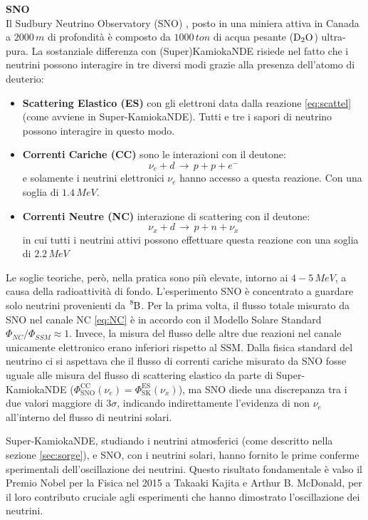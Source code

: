 \textbf{SNO}\\
Il Sudbury Neutrino Observatory (SNO) \cite{SNO:2002ziz}, posto in una miniera attiva in Canada a $2000\,\unit{m}$ di profondità è composto da $1000\,\unit{ton}$ di acqua pesante ($\ce{D_2O}$) ultra-pura. La sostanziale differenza con (Super)KamiokaNDE risiede nel fatto che i neutrini possono interagire in tre diversi modi grazie alla presenza dell'atomo di deuterio:
\vspace{0.4cm}
\begin{itemize}
    \item \textbf{Scattering Elastico (ES)} con gli elettroni data dalla reazione \ref{eq:scattel} (come avviene in Super-KamiokaNDE). Tutti e tre i sapori di neutrino possono interagire in questo modo.
    \item \textbf{Correnti Cariche (CC)} sono le interazioni con il deutone:
    \begin{equation}
        \nu_e+d\,\rightarrow\,p+p+e^-
    \end{equation}
    e solamente i neutrini elettronici $\nu_e$ hanno accesso a questa reazione. Con una soglia di $1.4\,\unit{MeV}$.
    \item \textbf{Correnti Neutre (NC)} interazione di scattering con il deutone: 
    \begin{equation}
        \nu_x+d\,\rightarrow\,p+n+\nu_x
        \label{eq:NC}
    \end{equation}
    in cui tutti i neutrini attivi possono effettuare questa reazione con una soglia di $2.2\,\unit{MeV}$
\end{itemize}
Le soglie teoriche, però, nella pratica sono più elevate, intorno ai $4-5\,\unit{MeV}$, a causa della radioattività di fondo. L'esperimento SNO è concentrato a guardare solo neutrini provenienti da $\ce{^8B}$. Per la prima volta, il flusso totale misurato da SNO nel canale NC \ref{eq:NC} è in accordo con il Modello Solare Standard $\Phi_{NC}/\Phi_{SSM}\approx1$. Invece, la misura del flusso delle altre due reazioni nel canale unicamente elettronico erano inferiori rispetto al SSM. 
Dalla fisica standard del neutrino ci si aspettava che il flusso di correnti cariche misurato da SNO fosse uguale alle misura del flusso di scattering elastico da parte di Super-KamiokaNDE ($\Phi_{\text{SNO}}^{\text{CC}}(\nu_e)=\Phi_{\text{SK}}^{\text{ES}}(\nu_x)$), ma SNO diede una discrepanza tra i due valori maggiore di $3\sigma$, indicando indirettamente l'evidenza di  non $\nu_e$ all'interno del flusso di neutrini solari.

Super-KamiokaNDE, studiando i neutrini atmosferici (come descritto nella sezione \ref{sec:sorge}), e SNO, con i neutrini solari, hanno fornito le prime conferme sperimentali dell'oscillazione dei neutrini. Questo risultato fondamentale è valso il Premio Nobel per la Fisica nel 2015 a Takaaki Kajita e Arthur B. McDonald, per il loro contributo cruciale agli esperimenti che hanno dimostrato l'oscillazione dei neutrini.
\vspace{0,5cm}


